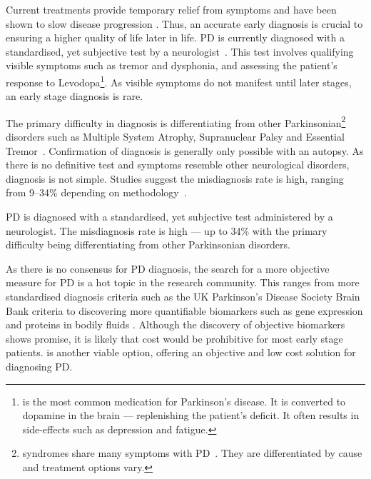 \documentclass[12pt, twoside]{book}
\renewcommand\emph[1]{\textit{\color{USred}{#1}}}
\begin{document}
Current treatments provide temporary relief from symptoms and have been shown to slow disease progression \cite{slowprog1, slowprog2, slowprog3} . Thus, an accurate early diagnosis is crucial to ensuring a higher quality of life later in life. PD is currently diagnosed with a standardised, yet subjective test by a neurologist~\cite{tolosadiagnosis26}. This test involves qualifying visible symptoms such as tremor and dysphonia, and assessing the patient's response to Levodopa\footnote{\emph{Levodopa} is the most common medication for Parkinson's disease. It is converted to dopamine in the brain --- replenishing the patient's deficit. It often results in side-effects such as depression and fatigue.}. As visible symptoms do not manifest until later stages, an early stage diagnosis is rare. 






The primary difficulty in diagnosis is differentiating from other Parkinsonian\footnote{\emph{Parkinsonian} syndromes share many symptoms with PD~\cite{parkinsonian}. They are differentiated by cause and treatment options vary. } disorders such as Multiple System Atrophy, Supranuclear Palsy and Essential Tremor~\cite{hughes2002accuracy,parkinsonismdifferential1}. Confirmation of diagnosis is generally only possible with an autopsy. As there is no definitive test and symptoms resemble other neurological disorders, diagnosis is not simple. Studies suggest the misdiagnosis rate is high, ranging from 9--34\% depending on methodology~\cite{tolosadiagnosis26, brooksdiagnosis25, jankovic2000evolution}. 


\begin{highlight}[Diagnosis]
PD is diagnosed with a standardised, yet subjective test administered by a neurologist. The misdiagnosis rate is high --- up to 34\% with the primary difficulty being differentiating from other Parkinsonian disorders.
\end{highlight}

As there is no consensus for PD diagnosis, the search for a more objective measure for PD is a hot topic in the research community. This ranges from more standardised diagnosis criteria such as the UK Parkinson's Disease Society Brain Bank criteria \cite{tolosadiagnosis26,brainbank,hughesdiagnosis100} to discovering more quantifiable biomarkers such as gene expression \cite{genemarkers, genome} and proteins in bodily fluids \cite{biomarkerfluid}. Although the discovery of objective biomarkers shows promise, it is likely that cost would be prohibitive for most early stage patients. \emph{Machine learning} is another viable option, offering an objective and low cost solution for diagnosing PD.
\end{document}
